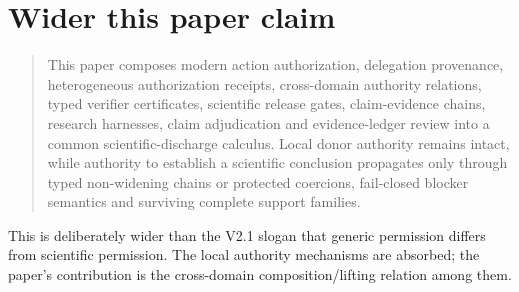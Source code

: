 \section{Wider this paper claim}

\begin{quote}
This paper composes modern action authorization, delegation provenance, heterogeneous authorization receipts, cross-domain authority relations, typed verifier certificates, scientific release gates, claim-evidence chains, research harnesses, claim adjudication and evidence-ledger review into a common scientific-discharge calculus. Local donor authority remains intact, while authority to establish a scientific conclusion propagates only through typed non-widening chains or protected coercions, fail-closed blocker semantics and surviving complete support families.
\end{quote}

This is deliberately wider than the V2.1 slogan that generic permission differs from scientific permission. The local authority mechanisms are absorbed; the paper's contribution is the cross-domain composition/lifting relation among them.
